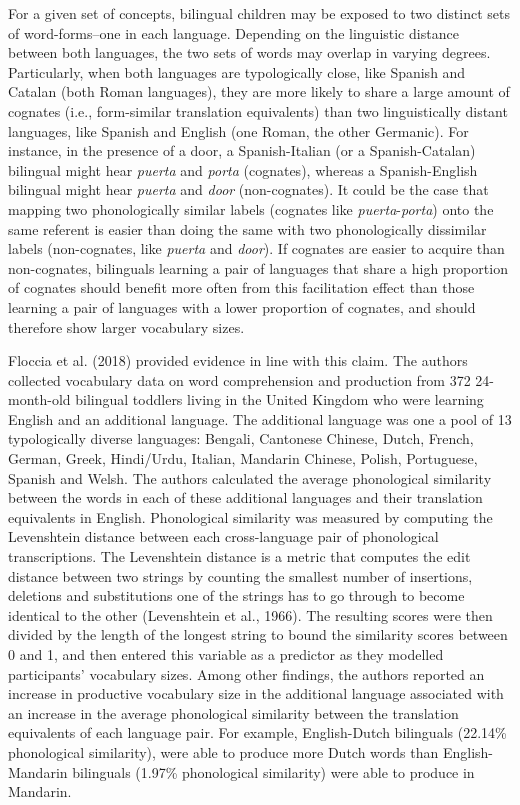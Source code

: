 \documentclass[
  letterpaper,
  DIV=11,
  numbers=noendperiod]{scrartcl}
\begin{document}
For a given set of concepts, bilingual children may be exposed to two
distinct sets of word-forms--one in each language. Depending on the
linguistic distance between both languages, the two sets of words may
overlap in varying degrees. Particularly, when both languages are
typologically close, like Spanish and Catalan (both Roman languages),
they are more likely to share a large amount of cognates (i.e.,
form-similar translation equivalents) than two linguistically distant
languages, like Spanish and English (one Roman, the other Germanic). For
instance, in the presence of a door, a Spanish-Italian (or a
Spanish-Catalan) bilingual might hear \emph{puerta} and \emph{porta}
(cognates), whereas a Spanish-English bilingual might hear \emph{puerta}
and \emph{door} (non-cognates). It could be the case that mapping two
phonologically similar labels (cognates like \emph{puerta}-\emph{porta})
onto the same referent is easier than doing the same with two
phonologically dissimilar labels (non-cognates, like \emph{puerta} and
\emph{door}). If cognates are easier to acquire than non-cognates,
bilinguals learning a pair of languages that share a high proportion of
cognates should benefit more often from this facilitation effect than
those learning a pair of languages with a lower proportion of cognates,
and should therefore show larger vocabulary sizes.

Floccia et al. (2018) provided evidence in line with this claim. The
authors collected vocabulary data on word comprehension and production
from 372 24-month-old bilingual toddlers living in the United Kingdom
who were learning English and an additional language. The additional
language was one a pool of 13 typologically diverse languages: Bengali,
Cantonese Chinese, Dutch, French, German, Greek, Hindi/Urdu, Italian,
Mandarin Chinese, Polish, Portuguese, Spanish and Welsh. The authors
calculated the average phonological similarity between the words in each
of these additional languages and their translation equivalents in
English. Phonological similarity was measured by computing the
Levenshtein distance between each cross-language pair of phonological
transcriptions. The Levenshtein distance is a metric that computes the
edit distance between two strings by counting the smallest number of
insertions, deletions and substitutions one of the strings has to go
through to become identical to the other (Levenshtein et al., 1966). The
resulting scores were then divided by the length of the longest string
to bound the similarity scores between 0 and 1, and then entered this
variable as a predictor as they modelled participants' vocabulary sizes.
Among other findings, the authors reported an increase in productive
vocabulary size in the additional language associated with an increase
in the average phonological similarity between the translation
equivalents of each language pair. For example, English-Dutch bilinguals
(22.14\% phonological similarity), were able to produce more Dutch words
than English-Mandarin bilinguals (1.97\% phonological similarity) were
able to produce in Mandarin.
\end{document}

